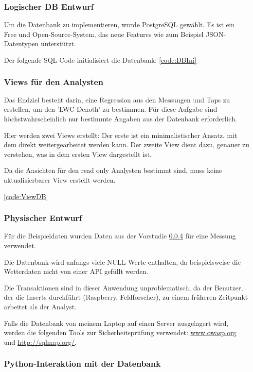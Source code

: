 \subsubsection{Logischer DB Entwurf}


Um die Datenbank zu implementieren, wurde PostgreSQL gewählt. Es ist ein Free und Open-Source-System, das neue Features wie zum Beispiel JSON-Datentypen unterstützt.

Der folgende SQL-Code initialisiert die Datenbank: \ref{code:DBIni}

\subsubsection{Views für den Analysten}
Das Endziel besteht darin, eine Regression aus den Messungen und Taps zu erstellen, um den 'LWC Denoth' zu bestimmen. Für diese Aufgabe sind höchstwahrscheinlich nur bestimmte Angaben aus der Datenbank erforderlich.

Hier werden zwei Views erstellt: Der erste ist ein minimalistischer Ansatz, mit dem direkt weitergearbeitet werden kann. Der zweite View dient dazu, genauer zu verstehen, was in dem ersten View dargestellt ist.

Da die Ansichten für den read only Analysten bestimmt sind, muss keine aktualisierbarer View erstellt werden.

\ref{code:ViewDB}

\subsubsection{Physischer Entwurf}
Für die Beispieldaten wurden Daten aus der Vorstudie \ref{} für eine Messung verwendet.

Die Datenbank wird anfangs viele NULL-Werte enthalten, da beispielsweise die Wetterdaten nicht von einer API gefüllt werden.

Die Transaktionen sind in dieser Anwendung unproblematisch, da der Benutzer, der die Inserts durchführt (Raspberry, Feldforscher), zu einem früheren Zeitpunkt arbeitet als der Analyst.

Falls die Datenbank von meinem Laptop auf einen Server ausgelagert wird, werden die folgenden Tools zur Sicherheitsprüfung verwendet: \href{https://www.owasp.org}{www.owasp.org} und \href{http://sqlmap.org/}{http://sqlmap.org/}.

\subsubsection{Python-Interaktion mit der Datenbank}

